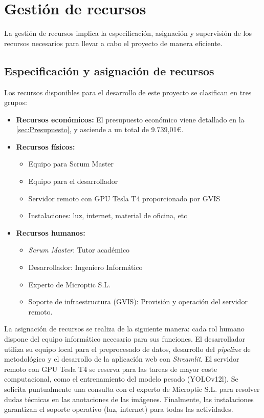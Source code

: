 \documentclass[12pt,a4paper,onecolumn,oneside]{report}
\begin{document}
\section{Gestión de recursos}
\label{Gestión de recursos}

La gestión de recursos implica la especificación, asignación y supervisión de los recursos necesarios para llevar a cabo el proyecto de manera eficiente.

\subsection{Especificación y asignación de recursos}
\label{Especificación y asignación de recursos}

Los recursos disponibles para el desarrollo de este proyecto se clasifican en tres grupos:

\begin{itemize}
  \item \textbf{Recursos económicos:} El presupuesto económico viene detallado en la \autoref{sec:Presupuesto}, y asciende a un total de 9.739,01\euro{}.
  \item \textbf{Recursos físicos:}
    \begin{itemize}[label=-]
      \item Equipo para Scrum Master
      \item Equipo para el desarrollador
      \item Servidor remoto con GPU Tesla T4 proporcionado por GVIS
      \item Instalaciones: luz, internet, material de oficina, etc
    \end{itemize}
  \item \textbf{Recursos humanos:} 
    \begin{itemize}[label=-]
      \item \textit{Scrum Master}: Tutor académico
      \item Desarrollador: Ingeniero Informático
      \item Experto de Microptic S.L.
      \item Soporte de infraestructura (GVIS): Provisión y operación del servidor remoto.
    \end{itemize}
\end{itemize}

La asignación de recursos se realiza de la siguiente manera: cada rol humano dispone del equipo informático necesario para sus 
funciones. El desarrollador utiliza su equipo local para el preprocesado de datos, desarrollo del \textit{pipeline} de metodológico y el desarrollo de la aplicación web con \textit{Streamlit}. 
El servidor remoto con GPU Tesla T4 se reserva para las tareas de mayor coste computacional, como el entrenamiento del modelo pesado (YOLOv12l).
Se solicita puntualmente una consulta con el experto de Microptic S.L. para resolver dudas técnicas en las anotaciones de las imágenes.
Finalmente, las instalaciones garantizan el soporte operativo (luz, internet) para todas las actividades.
\end{document}
